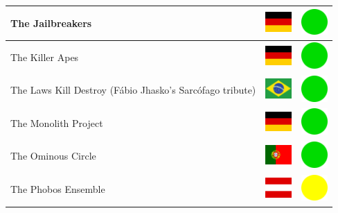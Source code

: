 \documentclass[12pt, a4paper, twoside]{report}
\begin{document}
\begin{center}
\begin{longtable}{|p{5cm}|p{2cm}|p{2cm}|}
 The Jailbreakers                                           & \includegraphics[width=1cm]{../4x3/de} &   \includegraphics[width=1cm]{../likes/y} \\ \hline
 The Killer Apes                                            & \includegraphics[width=1cm]{../4x3/de} &   \includegraphics[width=1cm]{../likes/y} \\ \hline
 The Laws Kill Destroy (Fábio Jhasko's Sarcófago tribute)   & \includegraphics[width=1cm]{../4x3/br} &   \includegraphics[width=1cm]{../likes/y} \\ \hline
 The Monolith Project                                       & \includegraphics[width=1cm]{../4x3/de} &   \includegraphics[width=1cm]{../likes/y} \\ \hline
 The Ominous Circle                                         & \includegraphics[width=1cm]{../4x3/pt} &   \includegraphics[width=1cm]{../likes/y} \\ \hline
 The Phobos Ensemble                                        & \includegraphics[width=1cm]{../4x3/at} &   \includegraphics[width=1cm]{../likes/m} \\ \hline

\end{longtable}
\end{center}
\end{document}
